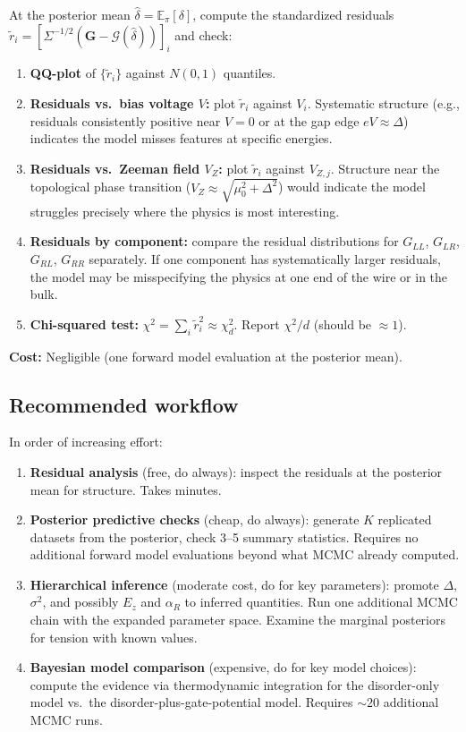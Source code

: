 \documentclass[11pt]{article}
\newcommand{\cG}{\mathcal{G}}
\newcommand{\E}{\mathbb{E}}
\theoremstyle{plain}
\theoremstyle{remark}
\theoremstyle{definition}
\begin{document}
At the posterior mean $\hat\delta = \E_\pi[\delta]$, compute the 
standardized residuals 
$\tilde{r}_i = [\Sigma^{-1/2}(\mathbf{G} - \cG(\hat\delta))]_i$ and 
check:
\begin{enumerate}[label=(\roman*)]
\item \textbf{QQ-plot} of $\{\tilde{r}_i\}$ against $N(0,1)$ quantiles.
\item \textbf{Residuals vs.\ bias voltage $V$:} plot $\tilde{r}_i$ 
  against $V_i$. Systematic structure (e.g., residuals consistently 
  positive near $V = 0$ or at the gap edge $eV \approx \Delta$) 
  indicates the model misses features at specific energies.
\item \textbf{Residuals vs.\ Zeeman field $V_Z$:} plot $\tilde{r}_i$ 
  against $V_{Z,j}$. Structure near the topological phase transition 
  ($V_Z \approx \sqrt{\mu_0^2 + \Delta^2}$) would indicate the model 
  struggles precisely where the physics is most interesting.
\item \textbf{Residuals by component:} compare the residual distributions 
  for $G_{LL}$, $G_{LR}$, $G_{RL}$, $G_{RR}$ separately. If one 
  component has systematically larger residuals, the model may be 
  misspecifying the physics at one end of the wire or in the bulk.
\item \textbf{Chi-squared test:} 
  $\chi^2 = \sum_i \tilde{r}_i^2 \approx \chi^2_d$. Report $\chi^2/d$ 
  (should be $\approx 1$).
\end{enumerate}

\textbf{Cost:} Negligible (one forward model evaluation at the posterior mean).

\subsection{Recommended workflow}

In order of increasing effort:
\begin{enumerate}[label=\textbf{\arabic*.}]
\item \textbf{Residual analysis} (free, do always): inspect the 
  residuals at the posterior mean for structure. Takes minutes.
\item \textbf{Posterior predictive checks} (cheap, do always): 
  generate $K$ replicated datasets from the posterior, check 3--5 
  summary statistics. Requires no additional forward model evaluations 
  beyond what MCMC already computed.
\item \textbf{Hierarchical inference} (moderate cost, do for key 
  parameters): promote $\Delta$, $\sigma^2$, and possibly $E_z$ and 
  $\alpha_R$ to inferred quantities. Run one additional MCMC chain with 
  the expanded parameter space. Examine the marginal posteriors for 
  tension with known values.
\item \textbf{Bayesian model comparison} (expensive, do for key 
  model choices): compute the evidence via thermodynamic integration 
  for the disorder-only model vs.\ the disorder-plus-gate-potential 
  model. Requires $\sim 20$ additional MCMC runs.
\end{enumerate}
\end{document}
